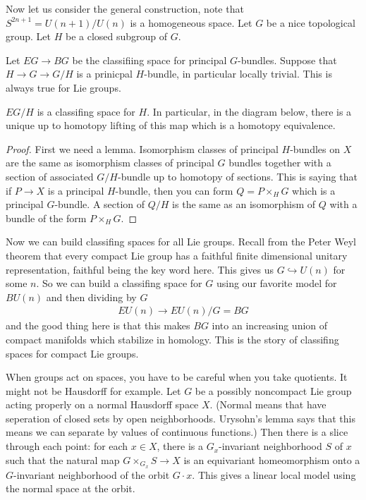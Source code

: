 \documentclass[12pt]{article}
\begin{document}
Now let us consider the general construction, note that $S^{2n+1} = U(n+1)/U(n)$ is a homogeneous space. Let $G$ be a nice topological group. Let $H$ be a closed subgroup of $G$.

Let $EG\to BG$ be the classifiing space for principal $G$-bundles. Suppose that $H\to G\to G/H$ is a prinicpal $H$-bundle, in particular locally trivial. This is always true for Lie groups. 

\begin{theorem}
    $EG/H$ is a classifing space for $H$. In particular, in the diagram below, there is a unique up to homotopy lifting of this map which is a homotopy equivalence. 
\begin{center}
\end{center}
\end{theorem}

\begin{proof}
    First we need a lemma. Isomorphism classes of principal $H$-bundles on $X$ are the same as isomorphism classes of principal $G$ bundles together with a section of associated $G/H$-bundle up to homotopy of sections. This is saying that if $P \to X$ is a principal $H$-bundle, then you can form $Q = P\times_H G$ which is a principal $G$-bundle. A section of $Q/H$ is the same as an isomorphism of $Q$ with a bundle of the form $P\times_H G$.
\end{proof}

Now we can build classifing spaces for all Lie groups. Recall from the Peter Weyl theorem that every compact Lie group has a faithful finite dimensional unitary representation, faithful being the key word here. This gives us $G \hookrightarrow U(n)$ for some $n$. So we can build a classifing space for $G$ using our favorite model for $BU(n)$ and then dividing by $G$ \begin{align*}
    EU(n) \to EU(n)/G = BG
\end{align*} and the good thing here is that this makes $BG$ into an increasing union of compact manifolds which stabilize in homology. This is the story of classifing spaces for compact Lie groups.

\begin{remark}
 When groups act on spaces, you have to be careful when you take quotients. It might not be Hausdorff for example. Let $G$ be a possibly noncompact Lie group acting properly on a normal Hausdorff space $X$. (Normal means that have seperation of closed sets by open neighborhoods. Urysohn's lemma says that this means we can separate by values of continuous functions.) Then there is a slice through each point: for each $x\in X$, there is a $G_x$-invariant neighborhood $S$ of $x$ such that the natural map $G\times_{G_x} S \to X$ is an equivariant homeomorphism onto a $G$-invariant neighborhood of the orbit $G\cdot x$. This gives a linear local model using the normal space at the orbit. 
\end{remark}
\end{document}

